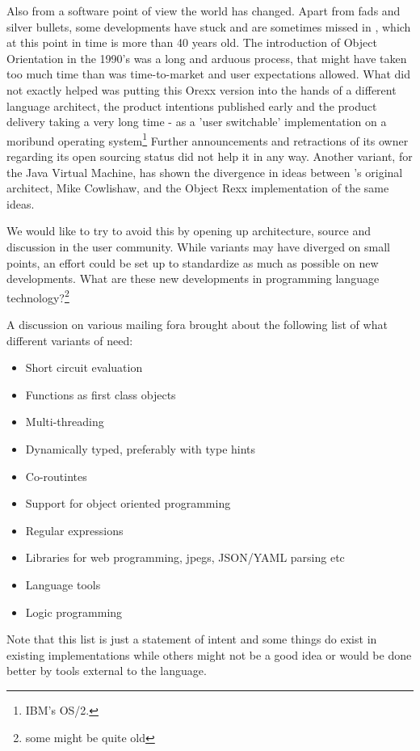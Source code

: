 Also from a software point of view the world has changed. Apart from
fads and silver bullets, some developments have stuck and are
sometimes missed in \rexx{}, which at this point in time is more than
40 years old. The introduction of Object Orientation in the 1990's was
a long and arduous process, that might have taken too much time than
was time-to-market and user expectations allowed. What did not exactly
helped was putting this Orexx version into the hands of a different
language architect, the product intentions published early and the
product delivery taking a very long time - as a 'user switchable'
implementation on a moribund operating
system\footnote{IBM's OS/2.} Further announcements and retractions
of its owner regarding its open sourcing status did not help it in any way.
Another variant, for the Java Virtual Machine, has shown the
divergence in ideas between \rexx{}'s original architect, Mike
Cowlishaw, and the Object Rexx implementation of the same ideas.

We would like to try to avoid this by opening up architecture, source
and discussion in the user community. While \rexx{} variants may have
diverged on small points, an effort could be set up to standardize as
much as possible on new developments. What are these new developments
in programming language technology?\footnote{some might be quite old}

A discussion on various mailing fora brought about the following list
of what different variants of \rexx{} need:
\begin{itemize}
\item Short circuit evaluation
\item Functions as first class objects
\item Multi-threading
\item Dynamically typed, preferably with type hints
\item Co-routintes
\item Support for object oriented programming
\item Regular expressions
\item Libraries for web programming, jpegs, JSON/YAML parsing etc
\item Language tools
\item Logic programming
\end{itemize}

Note that this list is just a statement of intent and some things
do exist in existing implementations while others might not be a
good idea or would be done better by tools external to the language.
  
